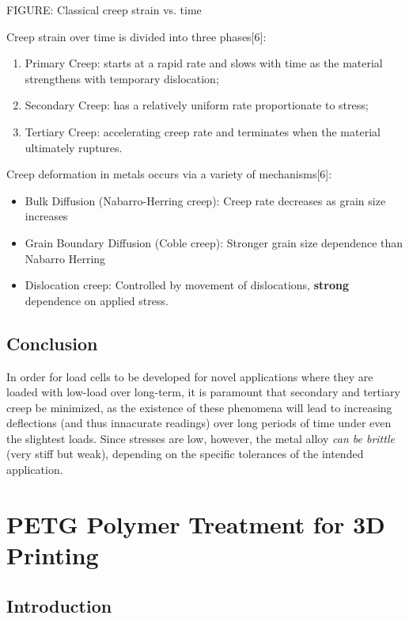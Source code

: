 \documentclass{report}
\begin{document}
FIGURE: Classical creep strain vs. time

Creep strain over time is divided into three phases[6]:
\begin{enumerate}
    \item Primary Creep: starts at a rapid rate and slows with time as the material strengthens with temporary dislocation;
    \item Secondary Creep: has a relatively uniform rate proportionate to stress;
    \item Tertiary Creep: accelerating creep rate and terminates when the material ultimately ruptures.
\end{enumerate}

Creep deformation in metals occurs via a variety of mechanisms[6]:
\begin{itemize}
    \item Bulk Diffusion (Nabarro-Herring creep): Creep rate decreases as grain size increases
    \item Grain Boundary Diffusion (Coble creep): Stronger grain size dependence than Nabarro Herring
    \item Dislocation creep: Controlled by movement of dislocations, \textbf{strong} dependence on applied
    stress.
\end{itemize}

\subsection{Conclusion}

In order for load cells to be developed for novel applications where they are loaded with low-load over long-term, it is paramount that secondary and tertiary creep be minimized, as the existence of these phenomena will lead to increasing deflections (and thus innacurate readings) over long periods of time under even the slightest loads.
Since stresses are low, however, the metal alloy \textit{can be brittle} (very stiff but weak), depending on the specific tolerances of the intended application.

\section{PETG Polymer Treatment for 3D Printing}

\subsection{Introduction}
\end{document}
